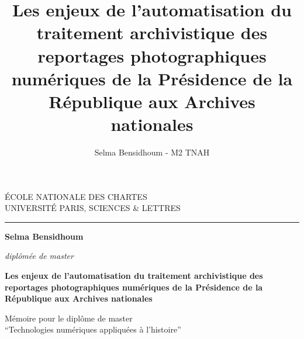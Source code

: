 \documentclass[a4paper,12pt,twoside]{book}
\author{Selma Bensidhoum - M2 TNAH}
\title{Les enjeux de l’automatisation du traitement archivistique des reportages photographiques numériques de la Présidence de la République aux Archives nationales}
\begin{document}
	\begin{titlepage}
		\begin{center}
			
			\bigskip
			
			\begin{large}				
				ÉCOLE NATIONALE DES CHARTES\\
				UNIVERSITÉ PARIS, SCIENCES \& LETTRES
			\end{large}
			\begin{center}\rule{2cm}{0.02cm}\end{center}
			
			\bigskip
			\bigskip
			\bigskip
			\begin{Large}
				\textbf{Selma Bensidhoum}\\
			\end{Large}
			\begin{normalsize}
				\textit{diplômée de master}
			\end{normalsize}
			
			\bigskip
			\bigskip
			\bigskip
			
			\begin{LARGE}
				\textbf{Les enjeux de l’automatisation du traitement archivistique des reportages photographiques numériques de la Présidence de la République aux Archives nationales}\\
			\end{LARGE}
			
			\bigskip
			\bigskip
			\bigskip
			\begin{large}
			\end{large}
			\vfill
			
			\begin{large}
				Mémoire 
				pour le diplôme de master \\
				\enquote{Technologies numériques appliquées à l'histoire} \\
			\end{large}
			
		\end{center}
	\end{titlepage}

	\thispagestyle{empty}	
	\cleardoublepage
	
\frontmatter
\end{document}
